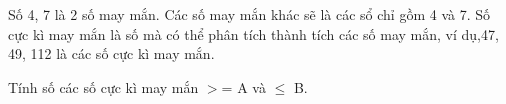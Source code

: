 Số 4, 7 là 2 số may mắn. Các số may mắn khác sẽ là các sổ chỉ gồm 4 và 7.  Số cực kì may mắn là số mà có thể phân tích thành tích các số may mắn,  ví dụ,47, 49, 112 là các số cực kì may mắn.  

   Tính số các số cực kì may mắn $>$= A và  $\le$ B.